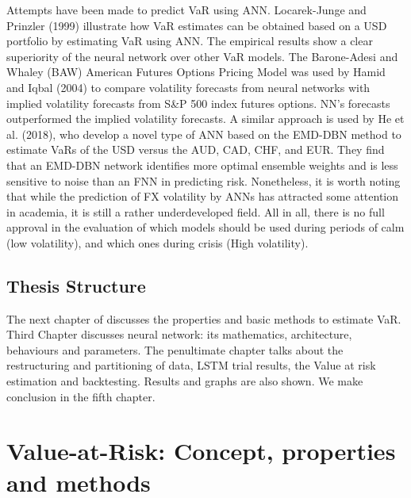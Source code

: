 \documentclass[a4paper,11pt,oneside]{book}
\begin{document}
\newline\newline
Attempts have been made to predict VaR using ANN. Locarek-Junge and Prinzler (1999) illustrate how VaR estimates can be obtained based on a USD portfolio by estimating VaR using ANN. The empirical results show a clear superiority of the neural network over other VaR models. The Barone-Adesi and Whaley (BAW) American Futures Options Pricing Model was used by Hamid and Iqbal (2004) to compare volatility forecasts from neural networks with implied volatility forecasts from S\&P 500 index futures options. NN's forecasts outperformed the implied volatility forecasts. A similar approach is used by He et al. (2018), who develop a novel type of ANN based on the EMD-DBN method to estimate VaRs of the USD versus the AUD, CAD, CHF, and EUR. They find that an EMD-DBN network identifies more optimal ensemble weights and is less sensitive to noise than an FNN in predicting risk. Nonetheless, it is worth noting that while the prediction of FX volatility by ANNs has attracted some attention in academia, it is still a rather underdeveloped field.
\newline\newline
All in all, there is no full approval in the evaluation of which models should be used during
periods of calm (low volatility), and which ones during crisis (High volatility).


\section{Thesis Structure}
The next chapter of discusses the properties and basic methods to estimate VaR. Third Chapter discusses neural network: its mathematics, architecture, behaviours and parameters. The penultimate chapter talks about the restructuring and partitioning of data, LSTM trial results, the Value at risk estimation and backtesting. Results and graphs are also shown. We make conclusion in the fifth chapter.




\chapter{Value-at-Risk: Concept,  properties and methods}
\end{document}
